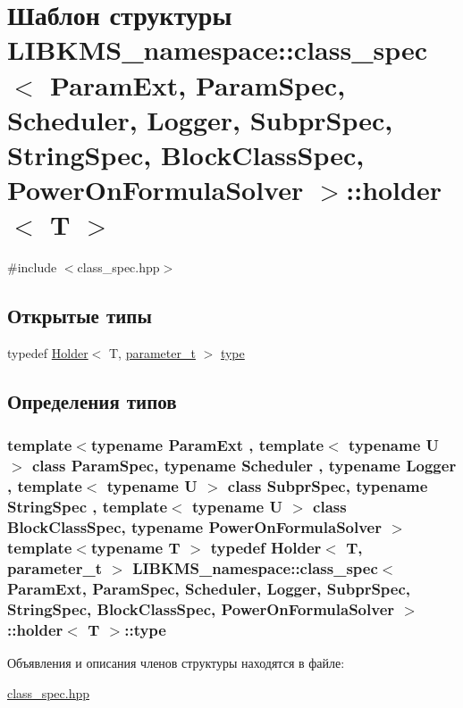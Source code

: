 \hypertarget{structLIBKMS__namespace_1_1class__spec_1_1holder}{\section{Шаблон структуры L\-I\-B\-K\-M\-S\-\_\-namespace\-:\-:class\-\_\-spec$<$ Param\-Ext, Param\-Spec, Scheduler, Logger, Subpr\-Spec, String\-Spec, Block\-Class\-Spec, Power\-On\-Formula\-Solver $>$\-:\-:holder$<$ T $>$}
\label{structLIBKMS__namespace_1_1class__spec_1_1holder}
}


{\ttfamily \#include $<$class\-\_\-spec.\-hpp$>$}

\subsection*{Открытые типы}
\begin{DoxyCompactItemize}
\item 
typedef \hyperlink{classLIBKMS__namespace_1_1Holder}{Holder}$<$ T, \hyperlink{structLIBKMS__namespace_1_1class__spec_a9dcd59cf4458e0bd59d72eaf15d0ed0e}{parameter\-\_\-t} $>$ \hyperlink{structLIBKMS__namespace_1_1class__spec_1_1holder_afebe7e3d748f9c15acda9828c8725c0f}{type}
\end{DoxyCompactItemize}


\subsection{Определения типов}
\hypertarget{structLIBKMS__namespace_1_1class__spec_1_1holder_afebe7e3d748f9c15acda9828c8725c0f}{
\subsubsection[{type}]{\setlength{\rightskip}{0pt plus 5cm}template$<$typename Param\-Ext , template$<$ typename U $>$ class Param\-Spec, typename Scheduler , typename Logger , template$<$ typename U $>$ class Subpr\-Spec, typename String\-Spec , template$<$ typename U $>$ class Block\-Class\-Spec, typename Power\-On\-Formula\-Solver $>$ template$<$typename T $>$ typedef {\bf Holder}$<$ T, {\bf parameter\-\_\-t} $>$ {\bf L\-I\-B\-K\-M\-S\-\_\-namespace\-::class\-\_\-spec}$<$ Param\-Ext, Param\-Spec, Scheduler, Logger, Subpr\-Spec, String\-Spec, Block\-Class\-Spec, Power\-On\-Formula\-Solver $>$\-::{\bf holder}$<$ T $>$\-::{\bf type}}}\label{structLIBKMS__namespace_1_1class__spec_1_1holder_afebe7e3d748f9c15acda9828c8725c0f}


Объявления и описания членов структуры находятся в файле\-:\begin{DoxyCompactItemize}
\item 
\hyperlink{class__spec_8hpp}{class\-\_\-spec.\-hpp}\end{DoxyCompactItemize}
